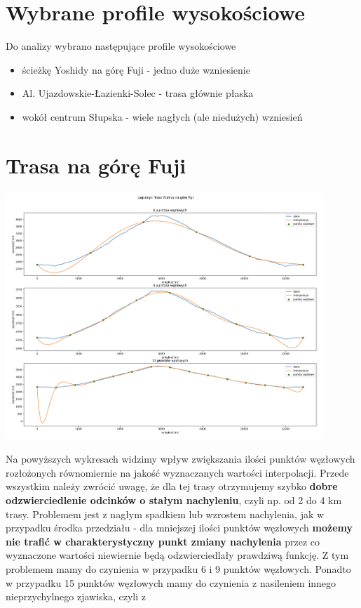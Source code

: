 \documentclass{article}
\begin{document}
\section{Wybrane profile wysokościowe}
Do analizy wybrano następujące profile wysokościowe
\begin{itemize}
	\item ścieżkę Yoshidy na górę Fuji - jedno duże wzniesienie
	\item Al.  Ujazdowskie-Łazienki-Solec - trasa głównie płaska
	\item wokół centrum Słupska - wiele nagłych (ale niedużych) wzniesień
\end{itemize}
\section{Trasa na górę Fuji}
\begin{center}
	\includegraphics[width=12cm]{lagrange_fuji_uniform}
\end{center}
Na powyższych wykresach widzimy wpływ zwiększania ilości punktów węzłowych rozłożonych równomiernie na jakość wyznaczanych wartości interpolacji. 
Przede wszystkim należy zwrócić uwagę, że dla tej trasy otrzymujemy szybko \textbf{dobre odzwierciedlenie odcinków o stałym nachyleniu}, czyli np.  od 2 do 4 km 
trasy. Problemem jest z nagłym spadkiem lub wzrostem nachylenia, jak w przypadku środka przedziału - dla mniejszej ilości punktów węzłowych \textbf{możemy nie trafić w charakterystyczny punkt zmiany nachylenia} przez co wyznaczone wartości niewiernie będą odzwierciedlały prawdziwą funkcję. Z tym problemem mamy do czynienia
w przypadku 6 i 9 punktów węzłowych. Ponadto w przypadku 15 punktów węzłowych mamy do czynienia z nasileniem innego nieprzychylnego zjawiska, czyli z 
\end{document}
